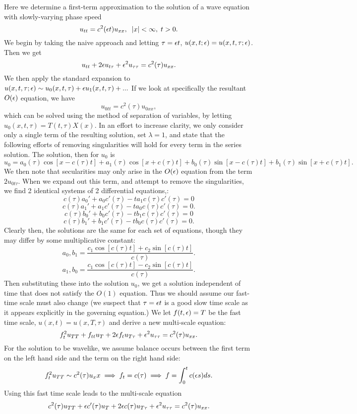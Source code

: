 \item Here we determine a first-term approximation to the solution of a wave equation with slowly-varying phase speed
    $$u_{tt}=c^2(\epsilon t)u_{xx},\;\;|x|<\infty,\; t>0.$$
    We begin by taking the naive approach and letting $\tau=\epsilon t$, $u(x,t;\epsilon)=u(x,t,\tau;\epsilon)$. Then we get
    $$u_{tt}+2\epsilon u_{t\tau}+\epsilon^2 u_{\tau\tau}=c^2(\tau)u_{xx}.$$
    We then apply the standard expansion to $u(x,t,\tau;\epsilon)\sim u_0(x,t,\tau)+\epsilon u_1(x,t,\tau)+...$
    If we look at specifically the resultant $O(\epsilon)$ equation, we have
    $$u_{0tt}=c^2(\tau)u_{0xx},$$
    which can be solved using the method of separation of variables, by letting $u_0(x,t,\tau)=T(t,\tau)X(x).$ In an effort to increase clarity, we only consider only a single term of the resulting solution, set $\lambda=1$, and state that the following efforts of removing singularities will hold for every term in the series solution. The solution, then for $u_0$ is
    $$u_0=a_0(\tau)\cos[x-c(\tau)t]+a_1(\tau)\cos[x+c(\tau)t]+b_0(\tau)\sin[x-c(\tau)t]+b_1(\tau)\sin[x+c(\tau)t].$$
 We then note that secularities may only arise in the $O(\epsilon)$ equation from the term $2u_{0t\tau}.$ When we expand out this term, and attempt to remove the singularities, we find 2 identical systems of 2 differential equations,:
 $$c(\tau)a_0'+a_0c'(\tau)-ta_1c(\tau)c'(\tau)=0$$
 $$c(\tau)a_1'+a_1c'(\tau)-ta_0c(\tau)c'(\tau)=0.$$
 $$c(\tau)b_0'+b_0c'(\tau)-tb_1c(\tau)c'(\tau)=0$$
 $$c(\tau)b_1'+b_1c'(\tau)-tb_0c(\tau)c'(\tau)=0.$$
 Clearly then, the solutions are the same for each set of equations, though they may differ by some multiplicative constant:
 $$a_0,b_1=\frac{c_1\cos[c(\tau)t]+c_2\sin[c(\tau)t]}{c(\tau)}.$$
 $$a_1,b_0=\frac{c_1\cos[c(\tau)t]-c_2\sin[c(\tau)t]}{c(\tau)}.$$
 Then substituting these into the solution $u_0$, we get a solution independent of time that does not satisfy the $O(1)$ equation. Thus we should assume our fast-time scale must also change (we suspect that $\tau=\epsilon t$ is a good slow time scale as it appears explicitly in the governing equation.) We let $f(t,\epsilon)=T$ be the fast time scale, $u(x,t)=u(x,T,\tau)$ and derive a new multi-scale equation:
  $$f_t^2u_{TT}+f_{tt}u_T+2\epsilon f_t u_{T\tau}+\epsilon^2u_{\tau\tau}=c^2(\tau)u_{xx}.$$
  For the solution to be wavelike, we assume balance occurs between the first term on the left hand side and the term on the right hand side:
  $$f_t^2u_{TT}\sim c^2(\tau)u_xx\implies f_t=c(\tau)\implies f=\int_0^t c(\epsilon s)ds.$$
  Using this fast time scale leads to the multi-scale equation
  $$c^2(\tau)u_{TT}+\epsilon c'(\tau)u_T+2\epsilon c(\tau) u_{T\tau}+\epsilon^2 u_{\tau\tau}=c^2(\tau)u_{xx}.$$
